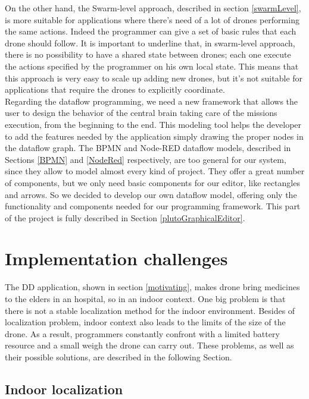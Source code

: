 On the other hand, the Swarm-level approach, described in section \ref{swarmLevel}, is more suitable for applications where there’s need of a lot of drones performing the same actions.
Indeed the programmer can give a set of basic rules that each drone should follow. It is important to underline that, in swarm-level approach, there is no possibility to have a shared state between drones; each one execute the actions specified by the programmer on his own local state. This means that this approach is very easy to scale up adding new drones, but it’s not suitable for applications that require the drones to explicitly coordinate.
\\

Regarding the dataflow programming, we need a new framework that allows the user to design the behavior of the central brain taking care of the missions execution, from the beginning to the end. 
This modeling tool helps the developer to add the features needed by the application simply drawing the proper nodes in the dataflow graph. 
The BPMN and Node-RED dataflow models, described in Sections \ref{BPMN} and \ref{NodeRed} respectively, are too general for our system, since they allow to model almost every kind of project.
They offer a great number of components, but we only need basic components for our editor, like rectangles and arrows.
So we decided to develop our own dataflow model, offering only the functionality and components needed for our programming framework.
This part of the project is fully described in Section \ref{plutoGraphicalEditor}.

\section {Implementation challenges}\label{challenges}

The DD application, shown in section \ref{motivating}, makes drone bring medicines to the elders in an hospital, so in an indoor context.
One big problem is that there is not a stable localization method for the indoor environment.
Besides of localization problem, indoor context also leads to the limits of the size of the drone.
As a result, programmers constantly confront with a limited battery resource and a small weigh the drone can carry out. These problems, as well as their possible solutions, are described in the following Section.

\subsection{Indoor localization}\label{indoor}

